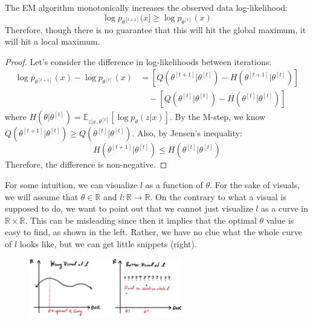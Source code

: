 \documentclass{article}
\begin{document}
  \begin{theorem}[EM Monotonicity]
    The EM algorithm monotonically increases the observed data log-likelihood:
    \begin{equation}
      \log p_{\theta^{[t+1]}}(x] \geq \log p_{\theta^{[t]}}(x)
    \end{equation}
    Therefore, though there is no guarantee that this will hit the global maximum, it will hit a local maximum. 
  \end{theorem}
  \begin{proof}
    Let's consider the difference in log-likelihoods between iterations:
    \begin{align}
      \log p_{\theta^{[t+1]}}(x) - \log p_{\theta^{[t]}}(x) &= \left[Q(\theta^{[t+1]}|\theta^{[t]}) - H(\theta^{[t+1]}|\theta^{[t]})\right] \\
      &\quad - \left[Q(\theta^{[t]}|\theta^{[t]}) - H(\theta^{[t]}|\theta^{[t]})\right]
    \end{align}
    where $H(\theta|\theta^{[t]}) = \mathbb{E}_{z|x,\theta^{[t]}}[\log p_{\theta}(z|x)]$. By the M-step, we know $Q(\theta^{[t+1]}|\theta^{[t]}) \geq Q(\theta^{[t]}|\theta^{[t]})$. Also, by Jensen's inequality:
    \begin{equation}
      H(\theta^{[t+1]}|\theta^{[t]}) \leq H(\theta^{[t]}|\theta^{[t]})
    \end{equation}
    Therefore, the difference is non-negative.
  \end{proof} 

  For some intuition, we can visualize $l$ as a function of $\theta$. For the sake of visuals, we will assume that $\theta \in \mathbb{R}$ and $l: \mathbb{R} \longrightarrow \mathbb{R}$. On the contrary to what a visual is supposed to do, we want to point out that we cannot just visualize $l$ as a curve in $\mathbb{R} \times \mathbb{R}$. This can be misleading since then it implies that the optimal $\theta$ value is easy to find, as shown in the left. Rather, we have no clue what the whole curve of $l$ looks like, but we can get little snippets (right). 

  \begin{figure}[H]
    \centering 
    \includegraphics[width=0.6\textwidth]{img/visual_of_l.jpg}
    \caption{} 
    \label{fig:visual_of_l}
  \end{figure}
\end{document}

